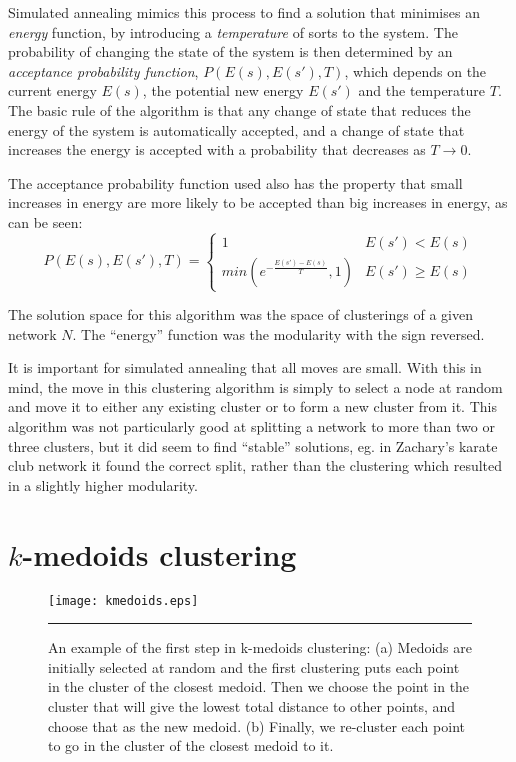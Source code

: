 Simulated annealing mimics this process to find a solution that minimises an \emph{energy} function, by introducing a \emph{temperature} of sorts to the system. The probability of changing the state of the system is then determined by an \emph{acceptance probability function}, $P(E(s),E(s'),T)$, which depends on the current energy $E(s)$, the potential new energy $E(s')$ and the temperature $T$.  The basic rule of the algorithm is that any change of state that reduces the energy of the system is automatically accepted, and a change of state that increases the energy is accepted with a probability that decreases as $T\rightarrow0$.

The acceptance probability function used also has the property that small increases in energy are more likely to be accepted than big increases in energy, as can be seen:
\begin{equation}
P(E(s),E(s'),T) = \left\{ \begin{array}{ll} 1 & E(s')<E(s) \\ min(e^{-\frac{E(s')-E(s)}{T}},1) & E(s') \geq E(s) \end{array} \right.
\end{equation}

The solution space for this algorithm was the space of clusterings of a given network $N$.  The ``energy'' function was the modularity with the sign reversed.

It is important for simulated annealing that all moves are small.  With this in mind, the move in this clustering algorithm is simply to select a node at random and move it to either any existing cluster or to form a new cluster from it.  This algorithm was not particularly good at splitting a network to more than two or three clusters, but it did seem to find ``stable'' solutions, eg. in Zachary's karate club network \cite{Zachary1977a} it found the correct split, rather than the clustering which resulted in a slightly higher modularity.


\section{$k$-medoids clustering}

\begin{figure}[htb]
  \centering
  \texttt{[image: kmedoids.eps]}
  \rule{35em}{0.5pt}
  \caption{An example of the first step in k-medoids clustering:  (a) Medoids 
    are initially selected at random and the first clustering puts each point 
    in the cluster of the closest medoid. Then we choose the point in the 
    cluster that will give the lowest total distance to other points, and 
    choose that as the new medoid. (b) Finally, we re-cluster each point to go 
    in the cluster of the closest medoid to it.}
  \label{kmed}
\end{figure}


